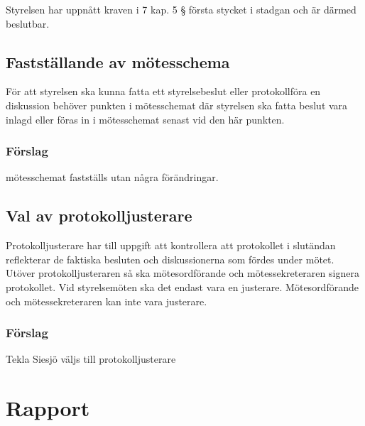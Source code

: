 \documentclass[protokoll]{dvd}
\begin{document}
\begin{attsatser}
    \item Styrelsen har uppnått kraven i 7 kap. 5 § första stycket i stadgan och är därmed beslutbar.
\end{attsatser}

\subsection{Fastställande av mötesschema}

För att styrelsen ska kunna fatta ett styrelsebeslut eller protokollföra en diskussion behöver punkten i mötesschemat där styrelsen ska fatta beslut vara inlagd eller föras in i mötesschemat senast vid den här punkten.

\subsubsection*{Förslag}

\begin{attsatser}
    \item mötesschemat fastställs utan några förändringar.
\end{attsatser}

\subsection{Val av protokolljusterare}

Protokolljusterare har till uppgift att kontrollera att protokollet i slutändan reflekterar de faktiska besluten och diskussionerna som fördes under mötet.
Utöver protokolljusteraren så ska mötesordförande och mötessekreteraren signera protokollet.
Vid styrelsemöten ska det endast vara en justerare.
Mötesordförande och mötessekreteraren kan inte vara justerare.

\subsubsection*{Förslag}
\begin{attsatser}
    \item Tekla Siesjö väljs till protokolljusterare
\end{attsatser}

\section{Rapport}

\end{document}
